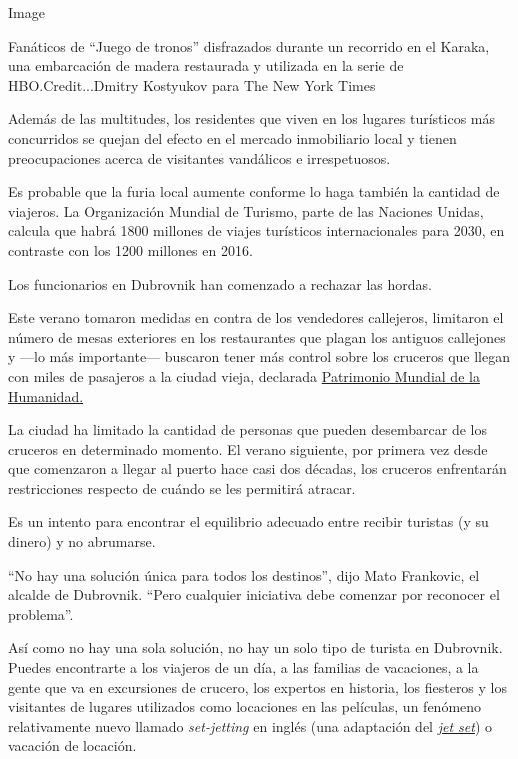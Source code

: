 Image

Fanáticos de ``Juego de tronos'' disfrazados durante un recorrido en el
Karaka, una embarcación de madera restaurada y utilizada en la serie de
HBO.Credit...Dmitry Kostyukov para The New York Times

Además de las multitudes, los residentes que viven en los lugares
turísticos más concurridos se quejan del efecto en el mercado
inmobiliario local y tienen preocupaciones acerca de visitantes
vandálicos e irrespetuosos.

Es probable que la furia local aumente conforme lo haga también la
cantidad de viajeros. La Organización Mundial de Turismo, parte de las
Naciones Unidas, calcula que habrá 1800 millones de viajes turísticos
internacionales para 2030, en contraste con los 1200 millones en 2016.

Los funcionarios en Dubrovnik han comenzado a rechazar las hordas.

Este verano tomaron medidas en contra de los vendedores callejeros,
limitaron el número de mesas exteriores en los restaurantes que plagan
los antiguos callejones y ---lo más importante--- buscaron tener más
control sobre los cruceros que llegan con miles de pasajeros a la ciudad
vieja, declarada \href{https://whc.unesco.org/es/list/95}{Patrimonio
Mundial de la Humanidad.}

La ciudad ha limitado la cantidad de personas que pueden desembarcar de
los cruceros en determinado momento. El verano siguiente, por primera
vez desde que comenzaron a llegar al puerto hace casi dos décadas, los
cruceros enfrentarán restricciones respecto de cuándo se les permitirá
atracar.

Es un intento para encontrar el equilibrio adecuado entre recibir
turistas (y su dinero) y no abrumarse.

``No hay una solución única para todos los destinos'', dijo Mato
Frankovic, el alcalde de Dubrovnik. ``Pero cualquier iniciativa debe
comenzar por reconocer el problema''.

Así como no hay una sola solución, no hay un solo tipo de turista en
Dubrovnik. Puedes encontrarte a los viajeros de un día, a las familias
de vacaciones, a la gente que va en excursiones de crucero, los expertos
en historia, los fiesteros y los visitantes de lugares utilizados como
locaciones en las películas, un fenómeno relativamente nuevo llamado
\emph{set-jetting} en inglés (una adaptación del
\href{https://www.fundeu.es/recomendacion/jet-set-extranjerismo/}{\emph{jet
set}}) o vacación de locación.

